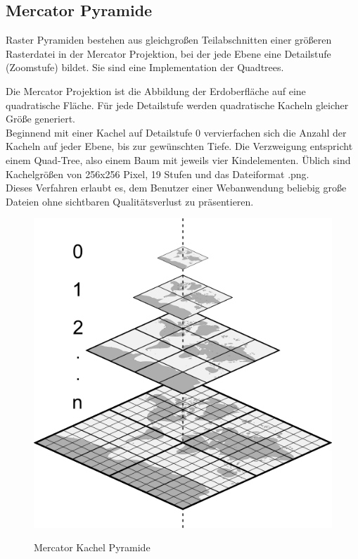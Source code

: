 \documentclass[10pt,conference,compsocconf]{IEEEtran}
\begin{document}
\subsection{Mercator Pyramide}
\label{sub:MercatorPyramide}
Raster Pyramiden bestehen aus gleichgroßen Teilabschnitten einer größeren Rasterdatei in der Mercator Projektion, bei der jede Ebene eine Detailstufe (Zoomstufe) bildet. Sie sind eine Implementation der Quadtrees. \par
Die Mercator Projektion ist die Abbildung der Erdoberfläche auf eine quadratische Fläche. Für jede Detailstufe werden quadratische Kacheln gleicher Größe generiert. \\
Beginnend mit einer Kachel auf Detailstufe 0 vervierfachen sich die Anzahl der Kacheln auf jeder Ebene, bis zur gewünschten Tiefe. Die Verzweigung entspricht einem Quad-Tree, also einem Baum mit jeweils vier Kindelementen. Üblich sind Kachelgrößen von 256x256 Pixel, 19 Stufen und das Dateiformat .png. \\
Dieses Verfahren erlaubt es, dem Benutzer einer Webanwendung beliebig große Dateien ohne sichtbaren Qualitätsverlust zu präsentieren.\\
\begin{figure}[H]
	\centering
	\includegraphics[width=0.6\columnwidth]{img/mercator_pyramid.png}\\
	\caption[]{Mercator Kachel Pyramide}
	\label{img:mercator_pyramid}
\end{figure}
\end{document}

